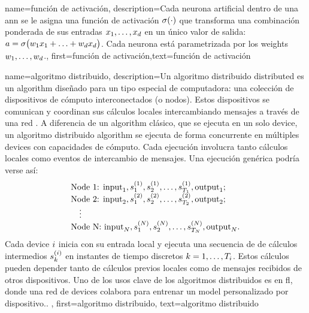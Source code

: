 {{
{name={función de activación},
	description={Cada neurona artificial dentro de una \gls{ann} se le asigna 
		una función de activación $\sigma(\cdot)$ que transforma una combinación ponderada de 
		sus entradas $x_{1},\ldots,x_{d}$ en un único valor de salida: 
		$a = \sigma\big(w_{1} x_{1}+\ldots+w_{d} x_{d} \big)$. 
		Cada neurona está parametrizada por los \gls{weights} $w_{1},\ldots,w_{d}$.},
first={función de activación},text={función de activación} 
}

{name={algoritmo distribuido},
	description={Un algoritmo distribuido distributed es un \gls{algorithm} diseñado para 
		un tipo especial de computadora: una colección de dispositivos de cómputo interconectados (o nodos). 
		Estos dispositivos se comunican y coordinan sus cálculos locales intercambiando mensajes
		a través de una red \cite{IntroDistAlg,ParallelDistrBook}. A diferencia de un \gls{algorithm} clásico,
		que se ejecuta en un solo \gls{device}, un algoritmo distribuido \gls{algorithm}  
		se ejecuta de forma concurrente en múltiples \gls{device}s con capacidades de cómputo. 
		Cada ejecución involucra tanto cálculos locales como eventos de intercambio de mensajes. 
		Una ejecución genérica podría verse así: 
		\[
		\begin{array}{l}
			\text{Node 1: } {\rm input}_1, s_1^{(1)}, s_2^{(1)}, \ldots, s_{T_1}^{(1)}, {\rm output}_1; \\
			\text{Node 2: } {\rm input}_2, s_1^{(2)}, s_2^{(2)}, \ldots, s_{T_2}^{(2)}, {\rm output}_2; \\
			\quad \vdots \\
			\text{Node N: } {\rm input}_N, s_1^{(N)}, s_2^{(N)}, \ldots, s_{T_N}^{(N)}, {\rm output}_N.
		\end{array}
		\]
		Cada \gls{device} $i$ inicia con su entrada local y ejecuta una secuencia de 
		de cálculos intermedios $s_{k}^{(i)}$ en instantes de tiempo discretos $k = 1, \dots, T_i$. 
		Estos cálculos pueden depender tanto de cálculos previos locales como de mensajes recibidos de otros dispositivos.
		Uno de los usos clave de los algoritmos distribuidos es en \gls{fl}, donde una red de 
		\gls{device}s colabora para entrenar un \gls{model} personalizado por dispositivo.. 
		},
	first={algoritmo distribuido}, text={algoritmo distribuido}
}


}}
